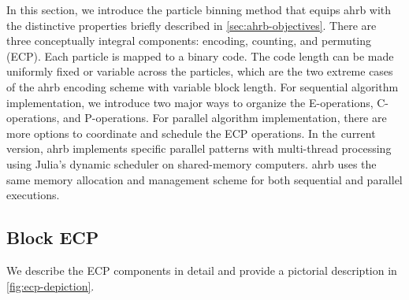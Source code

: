 \documentclass[final]{juliacon}
\begin{document}
%
%
%
%
%
%
%


In this section, we introduce the particle binning method that equips
{\sc ahrb} with the distinctive properties briefly described in
\cref{sec:ahrb-objectives}. There are three conceptually integral
components: encoding, counting, and permuting (ECP). Each particle is
mapped to a binary code. The code length can be made uniformly fixed
or variable across the particles, which are the two extreme cases of
the {\sc ahrb} encoding scheme with variable block length. For
sequential algorithm implementation, we introduce two major ways to
organize the E-operations, C-operations, and P-operations. 
%
For parallel algorithm implementation, there are more options to
coordinate and schedule the ECP operations. In the current version,
{\sc ahrb} implements specific parallel patterns with multi-thread
processing using Julia's dynamic scheduler on shared-memory computers.
{\sc ahrb} uses the same memory allocation and management scheme for
both sequential and parallel executions. 
%


\subsection{Block ECP}
\label{sec:ECP-description}

\vspace{3pt} We describe the ECP components in detail and provide a
pictorial description in \cref{fig:ecp-depiction}.

\vspace{2pt}
\end{document}
